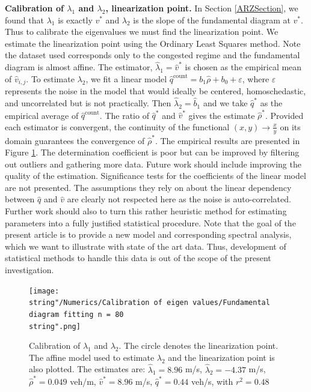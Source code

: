 \documentclass[preprint]{elsarticle}
\DeclareMathOperator{\cnt}{count}
\begin{document}
\textbf{Calibration of $\lambda_{1}$ and $\lambda_{2}$, linearization point.} In Section \ref{ARZSection}, we found that $\lambda_{1}$ is exactly $v^*$ and $\lambda_{2}$ is the slope of the fundamental diagram at $v^*$. Thus to calibrate the eigenvalues we must find the linearization point. We estimate the linearization point using the Ordinary Least Squares method. Note the dataset used corresponds only to the congested regime and the fundamental diagram is almost affine. The estimator, $\widehat{\lambda}_1=\widehat{v}^*$ is chosen as the empirical mean of $\widehat{v}_{i,j}$. To estimate $\lambda_{2}$, we fit a linear model $\widehat{q}^{\text{count}}=b_{1}\widehat{\rho}+b_{0}+\varepsilon$, where $\varepsilon$
represents the noise in the model that would ideally be centered,
homoschedastic, and uncorrelated but is not practically. Then $\widehat{\lambda}_{2}=\widehat{b}_{1}$ and we take $\widehat{q}^*$ as the empirical average of $\widehat{q}^{\cnt}$. The ratio of $\widehat{q}^*$ and $\widehat{v}^*$ gives the estimate $\widehat{\rho}^*$.
Provided each estimator is convergent, the continuity of the functional
$\left(x,y\right)\rightarrow\frac{x}{y}$ on its domain guarantees the convergence of $\widehat{\rho}^*$. The empirical results are presented in Figure \ref{fig:Calibration-of-eigen-values}. The determination coefficient is poor but can be improved by filtering out outliers and gathering more data. Future work should include improving the quality of the estimation. Significance tests for the coefficients of the linear model are not presented. The assumptions they rely on about
the linear dependency between $\widehat{q}$ and $\widehat{v}$ are clearly
not respected here as the noise is auto-correlated. Further work should also to turn this rather heuristic method for estimating parameters
into a fully justified statistical procedure. Note that the goal of the present article is to provide a new model and corresponding spectral analysis, which we want to illustrate with state of the art data. Thus, development of statistical methods to handle this data is out of the scope of the present investigation.

\begin{figure}[H]
\centering
\texttt{[image: \\string"/Numerics/Calibration of eigen values/Fundamental diagram fitting n = 80\\string".png]}
\protect\caption{Calibration of $\lambda_{1}$ and $\lambda_{2}$. The circle denotes the linearization point. The affine model used to estimate $\lambda_{2}$ and the linearization point is also plotted. The estimates are: $\widehat{\lambda}_{1}=8.96$ m/s, $\widehat{\lambda}_{2}=-4.37$ m/s,$\widehat{\rho}^{*}=0.049$ veh/m, $\widehat{v}^{*}=8.96$ m/s, $\widehat{q}^{*}=0.44$ veh/s, with $r^{2}=0.48$}
\label{fig:Calibration-of-eigen-values}
\end{figure}
\end{document}
